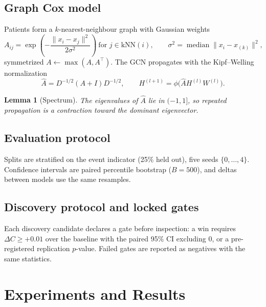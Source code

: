 \documentclass[12pt,a4paper]{article}
\newtheorem{lemma}{Lemma}
\begin{document}
\subsection{Graph Cox model}
Patients form a $k$-nearest-neighbour graph with Gaussian weights
\begin{equation}
  A_{ij} = \exp\!\left( - \frac{\lVert x_i - x_j \rVert^2}{2\sigma^2} \right)
  \ \text{for } j \in \mathrm{kNN}(i), \qquad
  \sigma^2 = \operatorname{median} \lVert x_i - x_{(k)} \rVert^2 ,
\end{equation}
symmetrized $A \leftarrow \max(A, A^\top)$. The GCN propagates with the
Kipf--Welling normalization
\begin{equation}
  \hat{A} = D^{-1/2} (A + I) D^{-1/2}, \qquad
  H^{(l+1)} = \phi\big( \hat{A} H^{(l)} W^{(l)} \big) .
\end{equation}
\begin{lemma}[Spectrum]
The eigenvalues of $\hat{A}$ lie in $(-1, 1]$, so repeated propagation is a
contraction toward the dominant eigenvector.
\end{lemma}
\subsection{Evaluation protocol}
Splits are stratified on the event indicator (25\% held out), five seeds
$\{0,\dots,4\}$. Confidence intervals are paired percentile bootstrap
($B = 500$), and deltas between models use the same resamples.
\subsection{Discovery protocol and locked gates}
Each discovery candidate declares a gate before inspection: a win requires
$\Delta C \ge +0.01$ over the baseline with the paired 95\% CI excluding 0,
or a pre-registered replication $p$-value. Failed gates are reported as
negatives with the same statistics.
\section{Experiments and Results}\label{sec:results}
\end{document}
